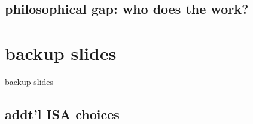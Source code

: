 


\subsection{philosophical gap: who does the work?}


\section{backup slides}
\begin{frame}{backup slides}
\end{frame}

\subsection{addt'l ISA choices}



